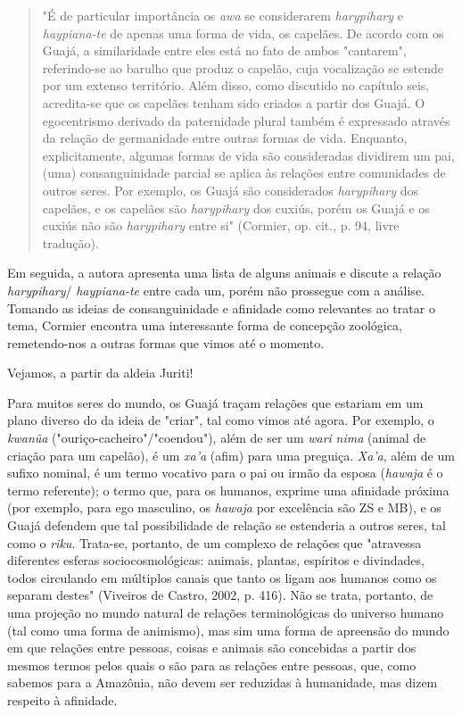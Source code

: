 \begin{quote}
"É de particular importância os \emph{awa} se considerarem
\emph{harypihary} e \emph{haypiana-te} de apenas uma forma de vida, os
capelães. De acordo com os Guajá, a similaridade entre eles está no fato
de ambos "cantarem", referindo-se ao barulho que produz o capelão, cuja
vocalização se estende por um extenso território. Além disso, como
discutido no capítulo seis, acredita-se que os capelães tenham sido
criados a partir dos Guajá. O egocentrismo derivado da paternidade
plural também é expressado através da relação de germanidade entre
outras formas de vida. Enquanto, explicitamente, algumas formas de vida
são consideradas dividirem um pai, (uma) consanguinidade parcial se
aplica às relações entre comunidades de outros seres. Por exemplo, os
Guajá são considerados \emph{harypihary} dos capelães, e os capelães são
\emph{harypihary} dos cuxiús, porém os Guajá e os cuxiús não são
\emph{harypihary} entre si" (Cormier, op. cit., p. 94, livre tradução).
\end{quote}

Em seguida, a autora apresenta uma lista de alguns animais e discute a
relação \emph{harypihary}/ \emph{haypiana-te} entre cada um, porém não
prossegue com a análise. Tomando as ideias de consanguinidade e
afinidade como relevantes ao tratar o tema, Cormier encontra uma
interessante forma de concepção zoológica, remetendo-nos a outras formas
que vimos até o momento.

Vejamos, a partir da aldeia Juriti!

Para muitos seres do mundo, os Guajá traçam relações que estariam em um
plano diverso do da ideia de "criar", tal como vimos até agora. Por
exemplo, o \emph{kwanũa} ("ouriço-cacheiro"/"coendou"), além de ser um
\emph{wari} \emph{nima} (animal de criação para um capelão), é um
\emph{xa'a} (afim) para uma preguiça. \emph{Xa'a}, além de um sufixo
nominal, é um termo vocativo para o pai ou irmão da esposa
(\emph{hawaja} é o termo referente); o termo que, para os humanos,
exprime uma afinidade próxima (por exemplo, para ego masculino, os
\emph{hawaja} por excelência são ZS e MB), e os Guajá defendem que tal
possibilidade de relação se estenderia a outros seres, tal como o
\emph{riku}. Trata-se, portanto, de um complexo de relações que
"atravessa diferentes esferas sociocosmológicas: animais, plantas,
espíritos e divindades, todos circulando em múltiplos canais que tanto
os ligam aos humanos como os separam destes" (Viveiros de Castro, 2002,
p. 416). Não se trata, portanto, de uma projeção no mundo natural de
relações terminológicas do universo humano (tal como uma forma de
animismo), mas sim uma forma de apreensão do mundo em que relações entre
pessoas, coisas e animais são concebidas a partir dos mesmos termos
pelos quais o são para as relações entre pessoas, que, como sabemos para
a Amazônia, não devem ser reduzidas à humanidade, mas dizem respeito à
afinidade.


